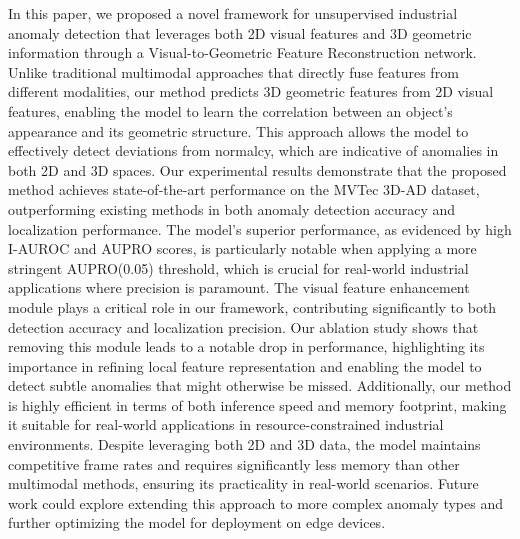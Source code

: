 In this paper, we proposed a novel framework for unsupervised industrial anomaly detection that leverages both 2D visual features and 3D geometric information through a Visual-to-Geometric Feature Reconstruction network. Unlike traditional multimodal approaches that directly fuse features from different modalities, our method predicts 3D geometric features from 2D visual features, enabling the model to learn the correlation between an object's appearance and its geometric structure. This approach allows the model to effectively detect deviations from normalcy, which are indicative of anomalies in both 2D and 3D spaces. Our experimental results demonstrate that the proposed method achieves state-of-the-art performance on the MVTec 3D-AD dataset, outperforming existing methods in both anomaly detection accuracy and localization performance. The model's superior performance, as evidenced by high I-AUROC and AUPRO scores, is particularly notable when applying a more stringent AUPRO(0.05) threshold, which is crucial for real-world industrial applications where precision is paramount. The visual feature enhancement module plays a critical role in our framework, contributing significantly to both detection accuracy and localization precision. Our ablation study shows that removing this module leads to a notable drop in performance, highlighting its importance in refining local feature representation and enabling the model to detect subtle anomalies that might otherwise be missed. Additionally, our method is highly efficient in terms of both inference speed and memory footprint, making it suitable for real-world applications in resource-constrained industrial environments. Despite leveraging both 2D and 3D data, the model maintains competitive frame rates and requires significantly less memory than other multimodal methods, ensuring its practicality in real-world scenarios. Future work could explore extending this approach to more complex anomaly types and further optimizing the model for deployment on edge devices.